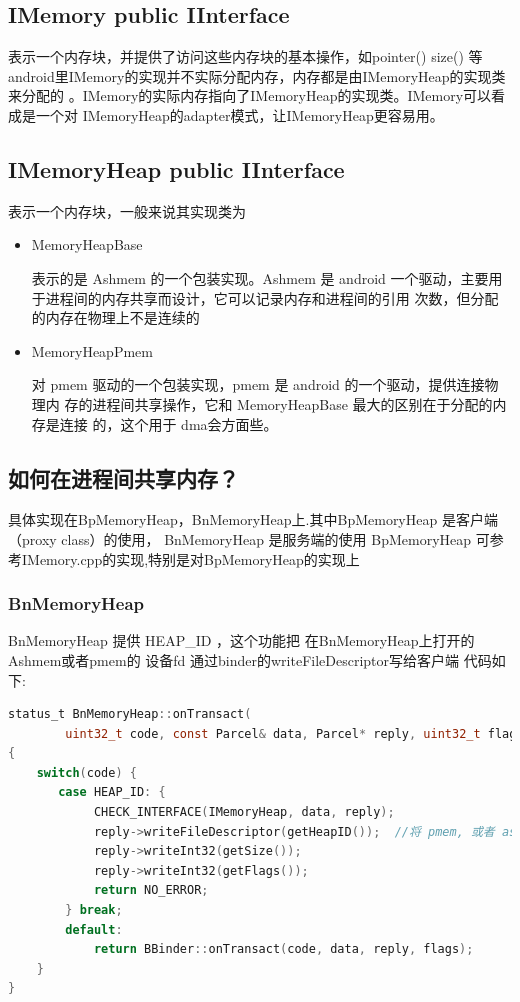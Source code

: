 \documentclass[a4paper,11pt]{article}
\begin{document}
\subsection{IMemory public IInterface}
表示一个内存块，并提供了访问这些内存块的基本操作，如pointer() size() 等
android里IMemory的实现并不实际分配内存，内存都是由IMemoryHeap的实现类来分配的
。IMemory的实际内存指向了IMemoryHeap的实现类。IMemory可以看成是一个对
IMemoryHeap的adapter模式，让IMemoryHeap更容易用。

\subsection{IMemoryHeap public IInterface}
表示一个内存块，一般来说其实现类为
\begin{itemize}
    \item MemoryHeapBase 

        表示的是 Ashmem 的一个包装实现。Ashmem 是 android
        一个驱动，主要用于进程间的内存共享而设计，它可以记录内存和进程间的引用
        次数，但分配的内存在物理上不是连续的

    \item MemoryHeapPmem  

        对 pmem 驱动的一个包装实现，pmem 是 android 的一个驱动，提供连接物理内
        存的进程间共享操作，它和 MemoryHeapBase 最大的区别在于分配的内存是连接
        的，这个用于 dma会方面些。
\end{itemize}
 
\subsection{ 如何在进程间共享内存？}
   具体实现在BpMemoryHeap，BnMemoryHeap上.其中BpMemoryHeap 是客户端（proxy class）的使用，
 BnMemoryHeap 是服务端的使用
  BpMemoryHeap
可参考IMemory.cpp的实现,特别是对BpMemoryHeap的实现上

\subsubsection{BnMemoryHeap}
  BnMemoryHeap  提供  HEAP_ID ，这个功能把 在BnMemoryHeap上打开的 Ashmem或者pmem的 设备fd 通过binder的writeFileDescriptor写给客户端
代码如下:
\begin{lstlisting}[language=c]
status_t BnMemoryHeap::onTransact(
        uint32_t code, const Parcel& data, Parcel* reply, uint32_t flags)
{
    switch(code) {
       case HEAP_ID: {
            CHECK_INTERFACE(IMemoryHeap, data, reply);
            reply->writeFileDescriptor(getHeapID());  //将 pmem, 或者 ashmem 的 fd 写给客户端
            reply->writeInt32(getSize());
            reply->writeInt32(getFlags());
            return NO_ERROR;
        } break;
        default:
            return BBinder::onTransact(code, data, reply, flags);
    }
}
\end{lstlisting}
 
\end{document}
